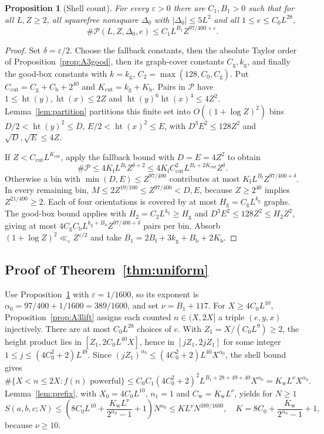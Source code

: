 \documentclass[11pt,reqno]{amsart}
\newtheorem{proposition}[theorem]{Proposition}
\theoremstyle{definition}
\theoremstyle{remark}
\numberwithin{equation}{section}
\newcommand{\eps}{\varepsilon}\newcommand{\card}{\#}
\newcommand{\hgt}{\operatorname{ht}}
\begin{document}
\begin{proposition}[Shell count]\label{prop:A3shell}
For every $\eps>0$ there are $C_1,B_1>0$
such that for all $L,Z\ge2$, all squarefree nonsquare $\Delta_0$ with
$|\Delta_0|\le5L^2$ and all $1\le e\le C_0L^{28}$,
\[
 \card\mathcal P(L,Z,\Delta_0,e)\le C_1L^{B_1}Z^{97/400+\eps}.
\]
\end{proposition}
\begin{proof}
Set $\delta=\eps/2$. Choose the fallback constants, then the absolute
Taylor order of Proposition~\ref{prop:A3good}, then its graph-cover
constants $C_{\mathrm g},k_{\mathrm g}$, and finally the good-box
constants with $k=k_{\mathrm g}$, $C_2=\max(128,C_0,C_{\mathrm g})$.
Put $C_{\mathrm{cut}}=C_{\mathrm g}+C_{\mathrm b}+2^{40}$ and
$K_{\mathrm{cut}}=k_{\mathrm g}+K_{\mathrm b}$.
Pairs in $\mathcal P$ have $1\le\hgt(y),\hgt(x)\le2Z$ and
$\hgt(y)^6\hgt(x)^4\le4Z^2$. Lemma~\ref{lem:partition} partitions
this finite set into $O((1+\log Z)^2)$ bins
$D/2<\hgt(y)^2\le D$, $E/2<\hgt(x)^2\le E$, with
$D^3E^2\le128Z^2$ and $\sqrt D,\sqrt E\le4Z$.

If $Z<C_{\mathrm{cut}}L^{K_{\mathrm{cut}}}$, apply the fallback bound
with $D=E=4Z^2$ to obtain
\[
 \card\mathcal P\le4K_{\mathrm f}L^{B_{\mathrm f}}Z^{\delta+2}
 \le4K_{\mathrm f}C_{\mathrm{cut}}^2
 L^{B_{\mathrm f}+2K_{\mathrm{cut}}}Z^\delta.
\]
Otherwise a bin with $\min(D,E)\le Z^{97/400}$ contributes at most
$K_{\mathrm f}L^{B_{\mathrm f}}Z^{97/400+\delta}$.
In every remaining bin,
$M\le2Z^{19/100}\le Z^{97/400}<D,E$, because
$Z\ge2^{40}$ implies $Z^{21/400}\ge2$.
Each of four orientations is covered by at most
$H_{\mathrm g}=C_{\mathrm g}L^{k_{\mathrm g}}$ graphs. The good-box
bound applies with $H_2=C_2L^{k_{\mathrm g}}\ge H_{\mathrm g}$ and
$D^3E^2\le128Z^2\le H_2Z^2$, giving at most
$4C_{\mathrm g}C_{\mathrm b}L^{k_{\mathrm g}+B_{\mathrm b}}
 Z^{97/400+\delta}$ pairs per bin.
Absorb $(1+\log Z)^2\ll_\eps Z^{\eps/2}$ and take
$B_1=2B_{\mathrm f}+3k_{\mathrm g}+B_{\mathrm b}+2K_{\mathrm b}$.
\end{proof}

\subsection{Proof of Theorem~\ref{thm:uniform}}\label{sec:A3proof}
Use Proposition~\ref{prop:A3shell} with $\eps=1/1600$,
so its exponent is $\alpha_0=97/400+1/1600=389/1600$, and set
$\nu=B_1+117$. For $X\ge4C_0L^{10}$, Proposition~\ref{prop:A3lift}
assigns each counted $n\in(X,2X]$ a triple $(e,y,x)$ injectively.
There are at most $C_0L^{28}$ choices of $e$. With
$Z_1=X/(C_0L^9)\ge2$, the height product lies in
$[Z_1,2C_0L^{40}X]$, hence in $[jZ_1,2jZ_1]$ for some integer
$1\le j\le(4C_0^2+2)L^{49}$.
Since $(jZ_1)^{\alpha_0}\le(4C_0^2+2)L^{40}X^{\alpha_0}$, the shell
bound gives
\[
 \#\{X<n\le2X:f(n)\text{ powerful}\}
 \le C_0C_1(4C_0^2+2)^2L^{B_1+28+49+40}X^{\alpha_0}
 =K_{\mathrm w}L^\nu X^{\alpha_0}.
\]
Lemma~\ref{lem:prefix}, with $X_0=4C_0L^{10}$, $n_1=1$ and
$C_{\mathrm w}=K_{\mathrm w}L^\nu$, yields for $N\ge1$
\[
 S(a,b,c;N)\le\left(8C_0L^{10}+
 \frac{K_{\mathrm w}L^\nu}{2^{\alpha_0}-1}+1\right)N^{\alpha_0}
 \le KL^\nu N^{389/1600},\quad
 K=8C_0+\frac{K_{\mathrm w}}{2^{\alpha_0}-1}+1,
\]
because $\nu\ge10$.
\end{document}

